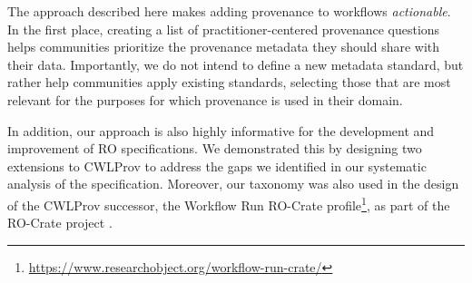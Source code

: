 The approach described here makes adding provenance to workflows \emph{actionable}. In the first place, creating a list of practitioner-centered provenance questions helps communities prioritize the provenance metadata they should share with their data. Importantly, we do not intend to define a new metadata standard, but rather help communities apply existing standards, selecting those that are most relevant for the purposes for which provenance is used in their domain. 






In addition, 
our approach is also highly informative for the development and improvement of RO specifications. We demonstrated this by designing two extensions to CWLProv to address the gaps we identified in our systematic analysis of the specification. Moreover, our taxonomy was also used in the design of the CWLProv successor, the Workflow Run RO-Crate profile\footnote{\url{https://www.researchobject.org/workflow-run-crate/}}, as part of the RO-Crate project \cite{soiland-reyesPackagingResearchArtefacts2022}.

